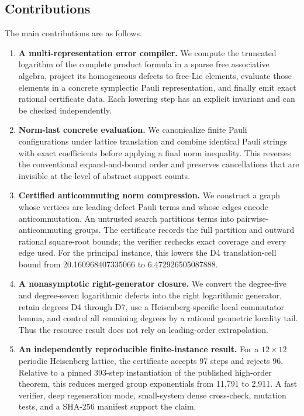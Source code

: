 \subsection{Contributions}

The main contributions are as follows.

\begin{enumerate}
\item \textbf{A multi-representation error compiler.}  We compute the
  truncated logarithm of the complete product formula in a sparse free
  associative algebra, project its homogeneous defects to free-Lie elements,
  evaluate those elements in a concrete symplectic Pauli representation, and
  finally emit exact rational certificate data.  Each lowering step has an
  explicit invariant and can be checked independently.

\item \textbf{Norm-last concrete evaluation.}  We canonicalize finite Pauli
  configurations under lattice translation and combine identical Pauli
  strings with exact coefficients before applying a final norm inequality.
  This reverses the conventional expand-and-bound order and preserves
  cancellations that are invisible at the level of abstract support counts.

\item \textbf{Certified anticommuting norm compression.}  We construct a
  graph whose vertices are leading-defect Pauli terms and whose edges encode
  anticommutation.  An untrusted search partitions terms into pairwise-
  anticommuting groups.  The certificate records the full partition and
  outward rational square-root bounds; the verifier rechecks exact coverage
  and every edge used.  For the principal instance, this lowers the D4
  translation-cell bound from 20.160968407335066 to 6.472926505087888.

\item \textbf{A nonasymptotic right-generator closure.}  We convert the
  degree-five and degree-seven logarithmic defects into the right logarithmic
  generator, retain degrees D4 through D7, use a Heisenberg-specific local
  commutator lemma, and control all remaining degrees by a rational geometric
  locality tail.  Thus the resource result does not rely on leading-order
  extrapolation.

\item \textbf{An independently reproducible finite-instance result.}  For a
  $12\times12$ periodic Heisenberg lattice, the certificate accepts 97 steps
  and rejects 96.  Relative to a pinned 393-step instantiation of the
  published high-order theorem, this reduces merged group exponentials from
  11,791 to 2,911.  A fast verifier, deep regeneration mode, small-system
  dense cross-check, mutation tests, and a SHA-256 manifest support the claim.
\end{enumerate}

